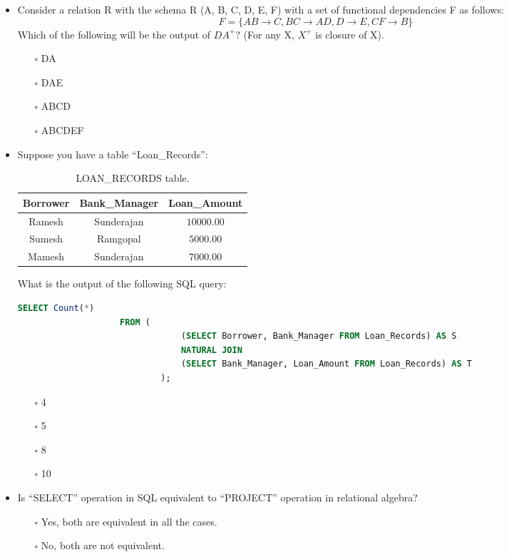 \documentclass[10pt]{article}
\newcommand{\lightrule}{%
	\arrayrulecolor{black!30}%
	\midrule[\lightrulewidth]%
	\arrayrulecolor{black}}
\begin{document}
\begin{itemize}
			\item Consider a relation R with the schema R (A, B, C, D, E, F) with a set of functional dependencies F as follows: $$F = \{AB \rightarrow C, BC \rightarrow AD, D \rightarrow E, CF \rightarrow B\}$$
			Which of the following will be the output of $DA^+$? (For any X, $X^+$ is closure of X).
				\begin{enumerate}
					\item[$\square$] DA
					\item[$\square$] DAE
					\item[$\square$] ABCD
					\item[$\square$] ABCDEF
				\end{enumerate}

			\newpage

			\item Suppose you have a table “Loan\_Records”:
				\begin{table}[H]
					\centering
					\begin{tabular}{@{} *{3}{c} @{}}
						\toprule
							\textbf{Borrower} & \textbf{Bank\_Manager} & \textbf{Loan\_Amount} \\
						\midrule
							Ramesh & Sunderajan & $10000.00$ \\ 
						\lightrule
							Sumesh & Ramgopal & $5000.00$ \\ 
						\lightrule
							Mamesh & Sunderajan & $7000.00$ \\ 
						\bottomrule
					\end{tabular}
					\caption{LOAN\_RECORDS table.}
				\end{table}
				What is the output of the following SQL query: 
				\begin{lstlisting}[language=SQL,firstline=1, lastline=6] 
					SELECT Count(*) 
					FROM (
								(SELECT Borrower, Bank_Manager FROM Loan_Records) AS S 
								NATURAL JOIN 
								(SELECT Bank_Manager, Loan_Amount FROM Loan_Records) AS T
							);
				\end{lstlisting}
				\begin{enumerate}
					\item[$\square$] 4
					\item[$\square$] 5
					\item[$\square$] 8
					\item[$\square$] 10
				\end{enumerate}

			\item  Is “SELECT” operation in SQL equivalent to “PROJECT” operation in relational algebra?
				\begin{enumerate}
					\item[$\square$] Yes, both are equivalent in all the cases.
					\item[$\square$] No, both are not equivalent. 
				\end{enumerate}


\end{itemize}
\end{document}
